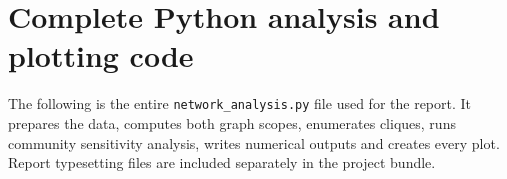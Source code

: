 \documentclass[11pt,a4paper]{article}
\begin{document}
\clearpage
\section{Complete Python analysis and plotting code}\label{app:code}
The following is the entire \texttt{network\_analysis.py} file used for the report.
It prepares the data, computes both graph scopes, enumerates cliques, runs
community sensitivity analysis, writes numerical outputs and creates every plot.
Report typesetting files are included separately in the project bundle.

\end{document}
